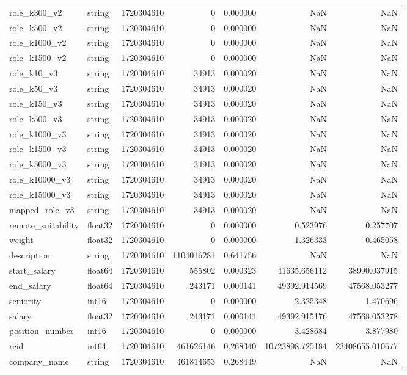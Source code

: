 \documentclass{article}
\begin{document}
\begin{longtable}{llrrrrr}
role_k300_v2 & string & 1720304610 & 0 & 0.000000 & NaN & NaN \\
role_k500_v2 & string & 1720304610 & 0 & 0.000000 & NaN & NaN \\
role_k1000_v2 & string & 1720304610 & 0 & 0.000000 & NaN & NaN \\
role_k1500_v2 & string & 1720304610 & 0 & 0.000000 & NaN & NaN \\
role_k10_v3 & string & 1720304610 & 34913 & 0.000020 & NaN & NaN \\
role_k50_v3 & string & 1720304610 & 34913 & 0.000020 & NaN & NaN \\
role_k150_v3 & string & 1720304610 & 34913 & 0.000020 & NaN & NaN \\
role_k500_v3 & string & 1720304610 & 34913 & 0.000020 & NaN & NaN \\
role_k1000_v3 & string & 1720304610 & 34913 & 0.000020 & NaN & NaN \\
role_k1500_v3 & string & 1720304610 & 34913 & 0.000020 & NaN & NaN \\
role_k5000_v3 & string & 1720304610 & 34913 & 0.000020 & NaN & NaN \\
role_k10000_v3 & string & 1720304610 & 34913 & 0.000020 & NaN & NaN \\
role_k15000_v3 & string & 1720304610 & 34913 & 0.000020 & NaN & NaN \\
mapped_role_v3 & string & 1720304610 & 34913 & 0.000020 & NaN & NaN \\
remote_suitability & float32 & 1720304610 & 0 & 0.000000 & 0.523976 & 0.257707 \\
weight & float32 & 1720304610 & 0 & 0.000000 & 1.326333 & 0.465058 \\
description & string & 1720304610 & 1104016281 & 0.641756 & NaN & NaN \\
start_salary & float64 & 1720304610 & 555802 & 0.000323 & 41635.656112 & 38990.037915 \\
end_salary & float64 & 1720304610 & 243171 & 0.000141 & 49392.914569 & 47568.053277 \\
seniority & int16 & 1720304610 & 0 & 0.000000 & 2.325348 & 1.470696 \\
salary & float32 & 1720304610 & 243171 & 0.000141 & 49392.915176 & 47568.053278 \\
position_number & int16 & 1720304610 & 0 & 0.000000 & 3.428684 & 3.877980 \\
rcid & int64 & 1720304610 & 461626146 & 0.268340 & 10723898.725184 & 23408655.010677 \\
company_name & string & 1720304610 & 461814653 & 0.268449 & NaN & NaN \\

\end{longtable}
\end{document}
